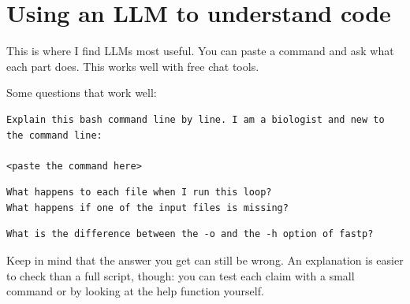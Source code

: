 \documentclass[
  letterpaper,
  DIV=11,
  numbers=noendperiod]{scrreprt}
\begin{document}
\section{Using an LLM to understand
code}\label{using-an-llm-to-understand-code}

This is where I find LLMs most useful. You can paste a command and ask
what each part does. This works well with free chat tools.

Some questions that work well:

\begin{verbatim}
Explain this bash command line by line. I am a biologist and new to the command line:

<paste the command here>
\end{verbatim}

\begin{verbatim}
What happens to each file when I run this loop?
What happens if one of the input files is missing?
\end{verbatim}

\begin{verbatim}
What is the difference between the -o and the -h option of fastp?
\end{verbatim}

Keep in mind that the answer you get can still be wrong. An explanation
is easier to check than a full script, though: you can test each claim
with a small command or by looking at the help function yourself.
\end{document}
